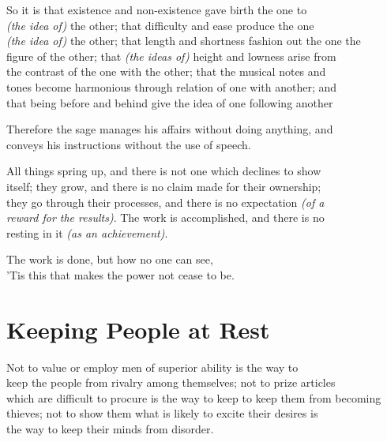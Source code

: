     So it is that existence and non-existence gave birth the one to\\
    \textit{(the idea of)} the other; that difficulty and ease produce the one\\
    \textit{(the idea of)} the other; that length and shortness fashion out the one the\\
    figure of the other; that \textit{(the ideas of)} height and lowness arise from\\
    the contrast of the one with the other; that the musical notes and\\
    tones become harmonious through relation of one with another; and\\
    that being before and behind give the idea of one following another\vspace{\baselineskip}
    
    Therefore the sage manages his affairs without doing anything, and\\
    conveys his instructions without the use of speech.\vspace{\baselineskip}
    
    All things spring up, and there is not one which declines to show\\
    itself; they grow, and there is no claim made for their ownership;\\
    they go through their processes, and there is no expectation \textit{(of a\\ reward for the results)}. The work is accomplished, and there is no\\
    resting in it \textit{(as an achievement)}.\vspace{\baselineskip}
    
    The work is done, but how no one can see,\\
    'Tis this that makes the power not cease to be.
    
    
\section*{Keeping People at Rest}
    Not to value or employ men of superior ability is the way  to\\
    keep the people from rivalry among themselves; not to prize articles\\
    which are difficult to procure is the way to keep to keep them from becoming\\
    thieves; not to show them what is likely to excite their desires is\\
    the way to keep their minds from disorder.\vspace{\baselineskip}
    
